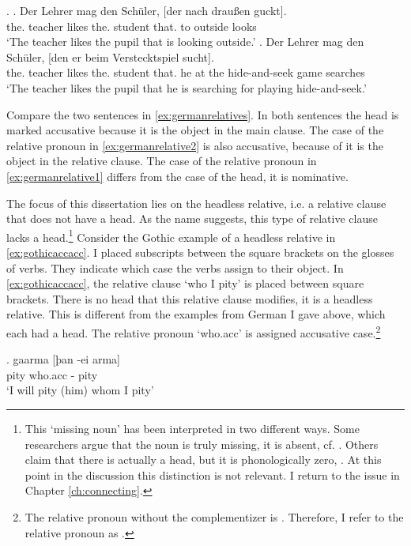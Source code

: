 \ex.\label{ex:germanrelatives}
\ag. Der Lehrer mag den Schüler, [der nach draußen guckt].\\
 the. teacher likes the. student that. to outside looks\\
 `The teacher likes the pupil that is looking outside.'\label{ex:germanrelative1}
 \bg. Der Lehrer mag den Schüler, [den er beim Verstecktspiel sucht].\\
 the. teacher likes the. student that. he {at the} {hide-and-seek game} searches\\
 `The teacher likes the pupil that he is searching for playing hide-and-seek.'\label{ex:germanrelative2}

Compare the two sentences in \ref{ex:germanrelatives}. In both sentences the head is marked accusative because it is the object in the main clause. The case of the relative pronoun in \ref{ex:germanrelative2} is also accusative, because of it is the object in the relative clause. The case of the relative pronoun in \ref{ex:germanrelative1} differs from the case of the head, it is nominative.


The focus of this dissertation lies on the headless relative, i.e. a relative clause that does not have a head. As the name suggests, this type of relative clause lacks a head.\footnote{
This `missing noun' has been interpreted in two different ways. Some researchers argue that the noun is truly missing, it is absent, cf. \citealt{vanriemsdijk2006}. Others claim that there is actually a head, but it is phonologically zero, \citealt{himmelreich2017}. At this point in the discussion this distinction is not relevant. I return to the issue in Chapter \ref{ch:connecting}.
}
Consider the Gothic example of a headless relative in \ref{ex:gothicaccacc}. I placed subscripts between the square brackets on the glosses of verbs. They indicate which case the verbs assign to their object.
In \ref{ex:gothicaccacc}, the relative clause  `who I pity' is placed between square brackets. There is no head that this relative clause modifies, it is a headless relative. This is different from the examples from German I gave above, which each had a head.
The relative pronoun  `who.\ac{acc}' is assigned accusative case.\footnote{
The relative pronoun without the complementizer  is . Therefore, I refer to the relative pronoun as .
}

\exg. gaarma [þan -ei arma]\\
 pity\scsub{[acc]} who.\ac{acc} - pity\scsub{[acc]}\\
 `I will pity (him) whom I pity' \label{ex:gothicaccacc}

